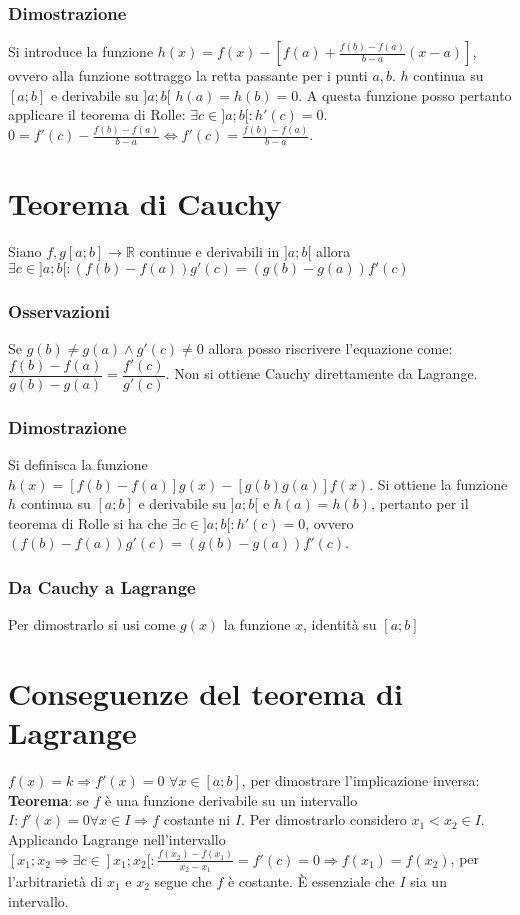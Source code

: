 \subsubsection{Dimostrazione}
Si introduce la funzione $h(x)=f(x)-[f(a)+\frac{f(b)-f(a)}{b-a}(x-a)]$, ovvero alla funzione sottraggo la retta passante per i punti $a,b$. $h$ continua su $[a;b]$ e
derivabile su $]a;b[$ $h(a)=h(b)=0$. A questa funzione posso pertanto applicare il teorema di Rolle: $\exists c\in ]a;b[:h'(c)=0$. $0=f'(c)-\frac{f(b)-f(a)}{b-a}
\Leftrightarrow f'(c)=\frac{f(b)-f(a)}{b-a}$. 
\section{Teorema di Cauchy}
Siano $f,g[a;b]\rightarrow\mathbb{R}$ continue e derivabili in $]a;b[$ allora $\exists c\in ]a;b[:(f(b)-f(a))g'(c)=(g(b)-g(a))f'(c)$
\subsubsection{Osservazioni}
Se $g(b)\neq g(a)\wedge g'(c)\neq 0$ allora posso riscrivere l'equazione come:$\dfrac{f(b)-f(a)}{g(b)-g(a)}=\dfrac{f'(c)}{g'(c)}$. Non si ottiene Cauchy direttamente da 
Lagrange.
\subsubsection{Dimostrazione}
Si definisca la funzione $h(x)=[f(b)-f(a)]g(x)-[g(b)g(a)]f(x)$. Si ottiene la funzione $h$ continua su $[a;b]$ e derivabile su $]a;b[$ e $h(a)=h(b)$, pertanto per il teorema
di Rolle si ha che $\exists c\in ]a;b[:h'(c)=0$, ovvero $(f(b)-f(a))g'(c)=(g(b)-g(a))f'(c)$.
\subsubsection{Da Cauchy a Lagrange}
Per dimostrarlo si usi come $g(x)$ la funzione $x$, identit\`a su $[a;b]$
\section{Conseguenze del teorema di Lagrange}
$f(x)=k\Rightarrow f'(x)=0$ $\forall x\in[a;b]$, per dimostrare l'implicazione inversa:\\
\textbf{Teorema}: se $f$ \`e una funzione derivabile su un intervallo $I:f'(x)=0\forall x\in I\Rightarrow f$ costante ni $I$. Per dimostrarlo considero $x_1<x_2\in I$. 
Applicando Lagrange nell'intervallo $[x_1;x_2\Rightarrow\exists c\in ]x_1;x_2[:\frac{f(x_2)-f(x_1)}{x_2-x_1}=f'(c)=0\Rightarrow f(x_1)=f(x_2)$, per l'arbitrariet\`a di
$x_1$ e $x_2$ segue che $f$ \`e costante. \`E essenziale che $I$ sia un intervallo. 
